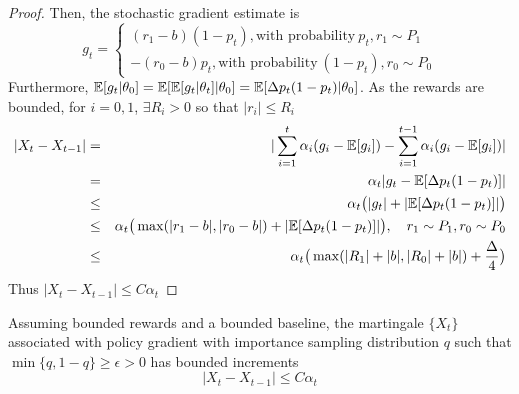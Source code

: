 \begin{proof}
Then, the stochastic gradient estimate 
is \[ g_t = \left\{
                \begin{array}{l}
                  (r_1 -b) (1-p_t), \text{with probability}\ p_t, r_1 \sim P_1 \\
                  - (r_0 - b) p_t, \text{with probability}\ (1-p_t), r_0 \sim P_0
                \end{array}
              \right.
              \]
        Furthermore, $\mathbb{E}[g_t|\theta_0] = \mathbb{E}[\mathbb{E}[g_t | \theta_t] | \theta_0] = \mathbb{E}[\Delta p_t (1-p_t) | \theta_0]$.
        As the rewards are bounded, for $i=0,1$, $\exists R_i >0$ so that $|r_i| \le R_i$
        \begin{eqnarray*}
        |X_t - X_{t-1}| &=&|\sum_{i=1}^t \alpha_i (g_i-\mathbb{E}[g_i])- \sum_{i=1}^{t-1} \alpha_i (g_i-\mathbb{E}[g_i])|\\
        &=& \alpha_t |g_t - \mathbb{E}[\Delta p_t(1-p_t)]|\\
        &\le& \alpha_t\big(|g_t| + |\mathbb{E}[\Delta p_t(1-p_t)]|\big)\\
         &\le& \alpha_t\big( \max(|r_1 - b|, |r_0-b|) + |\mathbb{E}[\Delta p_t(1-p_t)]|\big), \quad r_1 \sim P_1, r_0 \sim P_0\\
        &\le& \alpha_t \big(\max(|R_1| +|b|, |R_0|+|b|) + \frac{\Delta}{4}\big)
        \end{eqnarray*}
        Thus   $|X_t - X_{t-1}| \le C \alpha_t$

\end{proof}
\begin{lemma} Assuming bounded rewards and a bounded baseline, the martingale $\{X_t\}$ associated with policy gradient with importance sampling distribution $q$ such that $\min \{q, 1-q\} \ge \epsilon >0$ has bounded increments
$$|X_t - X_{t-1}| \le C \alpha_t$$
\end{lemma}

